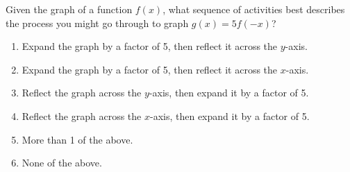 \bigskip


\item Given the graph of a function $f(x)$, what sequence of activities best describes the process you might go through to graph $g(x) = 5f(-x)$?

\begin{enumerate}
\item Expand the graph by a factor of 5, then reflect it across the $y$-axis.
\item Expand the graph by a factor of 5, then reflect it across the $x$-axis.
\item Reflect the graph across the $y$-axis, then expand it by a factor of 5.
\item Reflect the graph across the $x$-axis, then expand it by a factor of 5.
\item More than 1 of the above.
\item None of the above.
\end{enumerate}


